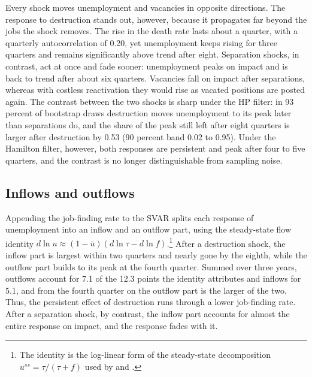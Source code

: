 \documentclass[authoryear, review, 12pt]{elsarticle}
\begin{document}
Every shock moves unemployment and vacancies in opposite directions. The response to destruction stands out, however, because it propagates far beyond the jobs the shock removes. The rise in the death rate lasts about a quarter, with a quarterly autocorrelation of 0.20, yet unemployment keeps rising for three quarters and remains significantly above trend after eight.
Separation shocks, in contrast, act at once and fade sooner: unemployment peaks on impact and is back to trend after about six quarters. Vacancies fall on impact after separations, whereas with costless reactivation they would rise as vacated positions are posted again.
The contrast between the two shocks is sharp under the HP filter: in 93 percent of bootstrap draws destruction moves unemployment to its peak later than separations do, and the share of the peak still left after eight quarters is larger after destruction by 0.53 (90 percent band 0.02 to 0.95). Under the Hamilton filter, however, both responses are persistent and peak after four to five quarters, and the contrast is no longer distinguishable from sampling noise.

\subsection{Inflows and outflows}

Appending the job-finding rate to the SVAR splits each response of unemployment into an inflow and an outflow part, using the steady-state flow identity $d\ln u \approx (1-\bar u)(d\ln\tau - d\ln f)$.\footnote{The identity is the log-linear form of the steady-state decomposition $u^{ss}=\tau/(\tau+f)$ used by \citet{shimer_2012} and \citet{broer_2025}.}
After a destruction shock, the inflow part is largest within two quarters and nearly gone by the eighth, while the outflow part builds to its peak at the fourth quarter. Summed over three years, outflows account for 7.1 of the 12.3 points the identity attributes and inflows for 5.1, and from the fourth quarter on the outflow part is the larger of the two. Thus, the persistent effect of destruction runs through a lower job-finding rate. After a separation shock, by contrast, the inflow part accounts for almost the entire response on impact, and the response fades with it.
\end{document}
